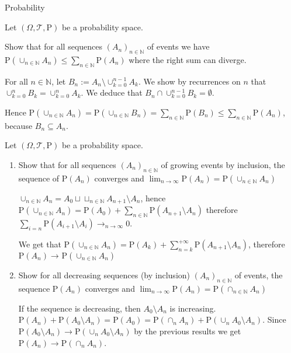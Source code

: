 \documentclass[a4paper,11pt]{exam}
\newcommand{\N}{\mathbb{N}}
\renewcommand{\P}{\mathrm{P}}
\begin{document}
\begin{questions}
	

\begin{EnvFullwidth}
	\colorbox{gris}{
		\begin{minipage}[c]{\textwidth}
			Probability
		\end{minipage}
	}
\end{EnvFullwidth}


\question
Let $(\Omega,\mathcal{T},\P)$ be a probability space.

Show that for all sequences $(A_n)_{n \in \N}$ of events we have
$
\P(\cup_{n \in \N}A_n) \leq \sum_{n \in \N}\P(A_n)
$
where the right sum can diverge.

\begin{solution}
	For all $n \in \N$, let $B_n := A_n \setminus \cup_{k = 0}^{n-1}A_k$.
	We show by recurrences on $n$ that $\cup_{k = 0}^nB_k = \cup_{k = 0}^nA_k$.
	We deduce that $B_n \cap \cup_{k = 0}^{n-1}B_k = \emptyset$.
	
	Hence $\P(\cup_{n \in \N}A_n) = \P(\cup_{n \in \N}B_n)
	= \sum_{n \in \N}\P(B_n) \leq \sum_{n \in \N}\P(A_n)$,
	because $B_n \subseteq A_n$.
\end{solution} 

\question
Let $(\Omega,\mathcal{T},\P)$ be a probability space.
\begin{enumerate}
	\item Show that for all sequences $(A_n)_{n \in \N}$ of growing events by inclusion, the sequence of $\P(A_n)$ converges and
	$
	\lim_{n \to \infty} \P(A_n) = \P(\cup_{n \in \N}A_n)
	$
	
	
	\begin{solution}
		$\cup_{n \in \N}A_n = A_0 \sqcup \sqcup_{n \in \N}A_{n+1}\setminus A_n$,
		hence $\P(\cup_{n \in \N}A_n)
		= \P(A_0) + \sum_{n \in \N}\P(A_{n+1} \setminus A_n)$ therefore
		$\sum_{i = n}\P(A_{i+1}\setminus A_i) \to_{n \to \infty}0$.
		
		We get that $\P(\cup_{n \in \N}A_n)
		= \P(A_k) + \sum_{n = k}^{+\infty}\P(A_{n+1} \setminus A_n)$, therefore
		$\P(A_n) \to_{} \P(\cup_{n \in \N}A_n)$
	\end{solution}
	
	\item Show for all decreasing sequences  (by inclusion) $(A_n)_{n \in \N}$ of events, the sequence $\P(A_n)$ converges and
	$
	\lim_{n \to \infty} \P(A_n) = \P(\cap_{n \in \N}A_n)
	$
	
	\begin{solution}
		If the sequence is decreasing, then $A_0 \setminus A_n$ is increasing.
		$\P(A_n) + \P(A_0 \setminus A_n) = \P(A_0)
		= \P(\cap_{n}A_n) + \P(\cup_{n}A_0\setminus A_n)$.
		Since $\P(A_0 \setminus A_n) \to \P(\cup_{n}A_0\setminus A_n)$ by the previous results we get $\P(A_n) \to \P(\cap_{n}A_n)$.
	\end{solution} 
\end{enumerate}


\end{questions}
\end{document}
